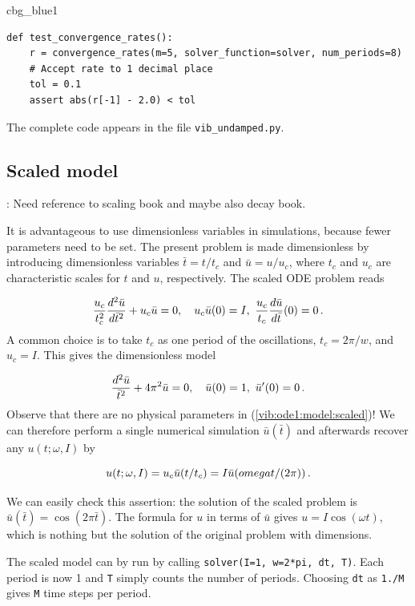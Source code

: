 \documentclass[%
oneside,                 %
final,                   %
10pt]{article}
\newenvironment{_cod_tight}[1]{
   \def\FrameCommand{\colorbox{#1}}
   \FrameRule0.6pt\MakeFramed {\FrameRestore}\vskip3mm}
   {\vskip0mm\endMakeFramed}
\newenvironment{cod}[1]{
\bgroup\rmfamily
\fboxsep=0mm\relax
\begin{_cod_tight}{#1}
\list{}{\parsep=-2mm\parskip=0mm\topsep=0pt\leftmargin=2mm
\rightmargin=2\leftmargin\leftmargin=4pt\relax}
\item\relax}
{\endlist\end{_cod_tight}\egroup}
\newcommand{\shortinlinecomment}[3]{{\color{red}{\bf #1}: #2}}
\begin{document}
\begin{cod}{cbg_blue1}\begin{Verbatim}[numbers=none,fontsize=\fontsize{9pt}{9pt},baselinestretch=0.95,xleftmargin=2mm]
def test_convergence_rates():
    r = convergence_rates(m=5, solver_function=solver, num_periods=8)
    # Accept rate to 1 decimal place
    tol = 0.1
    assert abs(r[-1] - 2.0) < tol
\end{Verbatim}
\end{cod}
\noindent
The complete code appears in the file \Verb!vib_undamped.py!.

\subsection{Scaled model}

\shortinlinecomment{hpl 4}{ Need reference to scaling book and maybe also decay book. }{ Need reference to scaling }

It is advantageous to use dimensionless variables in simulations, because
fewer parameters need to be set. The present problem is made dimensionless
by introducing dimensionless variables $\bar t = t/t_c$ and $\bar u = u/u_c$,
where $t_c$ and $u_c$ are characteristic scales for $t$ and $u$,
respectively. The scaled ODE problem reads

\[ \frac{u_c}{t_c^2}\frac{d^2\bar u}{d\bar t^2} + u_c\bar u = 0,\quad
u_c\bar u(0) = I,\ \frac{u_c}{t_c}\frac{d\bar u}{d\bar t}(0)=0\tp\]
A common choice is to take $t_c$ as one period of
the oscillations, $t_c = 2\pi/w$, and $u_c=I$.
This gives the dimensionless model

\begin{equation}
\frac{d^2\bar u}{\bar t^2} + 4\pi^2 \bar u = 0,\quad \bar u(0)=1,\ 
\bar u^{\prime}(0)=0\tp
\label{vib:ode1:model:scaled}
\end{equation}
Observe that there are no physical parameters in (\ref{vib:ode1:model:scaled})!
We can therefore perform
a single numerical simulation $\bar u(\bar t)$ and afterwards
recover any $u(t; \omega, I)$ by

\[ u(t;\omega, I) = u_c\bar u(t/t_c) = I\bar u(omega t/(2\pi))\tp\]

We can easily check this assertion: the solution of the scaled problem
is $\bar u(\bar t) = \cos(2\pi\bar t)$. The formula for $u$ in terms
of $\bar u$ gives $u = I\cos(\omega t)$, which is nothing but the solution
of the original problem with dimensions.

The scaled model can by run by calling \texttt{solver(I=1, w=2*pi, dt, T)}.
Each period is now 1 and \texttt{T} simply counts the number of periods.
Choosing \texttt{dt} as \texttt{1./M} gives \texttt{M} time steps per period.
\end{document}
